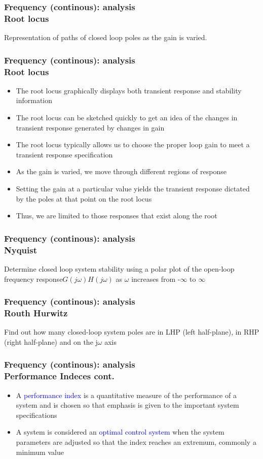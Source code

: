 \documentclass[hyperref={pdfpagelabels=true}]{beamer}
\begin{document}
\begin{frame}
\frametitle{Frequency (continous): analysis \\ {\large Root locus}}
Representation of paths of closed loop poles as the gain
is varied.
\end{frame}

\begin{frame}
\frametitle{Frequency (continous): analysis \\ {\large Root locus}}
\begin{itemize}
\item The root locus graphically displays both transient response and
stability information
\item The root locus can be sketched quickly to get an idea of the
changes in transient response generated by changes in gain
\item The root locus typically allows us to choose the proper loop gain
to meet a transient response specification
\item As the gain is varied, we move through different regions of
response
\item Setting the gain at a particular value yields the transient response
dictated by the poles at that point on the root locus
\item Thus, we are limited to those responses that exist along the root
\end{itemize}
\end{frame}

\begin{frame}
\frametitle{Frequency (continous): analysis \\ {\large Nyquist}}
Determine closed loop system stability using a polar
plot of the open-loop frequency response$ G (j\omega)H(j\omega)$
as $\omega$ increases from -$\infty$ to $\infty$
\end{frame}

\begin{frame}
\frametitle{Frequency (continous): analysis \\ {\large Routh Hurwitz}}
Find out how many closed-loop system poles are in LHP
(left half-plane), in RHP (right half-plane) and on the
j$\omega$ axis
\end{frame}

\begin{frame}
\frametitle{Frequency (continous): analysis \\ {\large Performance Indeces cont.}}
\begin{itemize}
\item A \textcolor{blue}{performance index} is a quantitative measure of
the performance of a system and is chosen so that
emphasis is given to the important system
specifications
\item A system is considered an \textcolor{blue}{optimal control system}
when the system parameters are adjusted so that
the index reaches an extremum, commonly a
minimum value
\end{itemize}
\end{frame}
\end{document}

